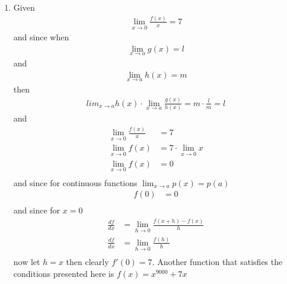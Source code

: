 \documentclass[10pt]{article}
\begin{document}
\begin{enumerate}
        \pagebreak
    \item Given
        \begin{align*}
        \lim_{x \to 0}\frac{f(x)}{x} = 7
        \end{align*}
        and since when 
        \begin{align*}
            \lim_{x \to a}g(x) = l
        \end{align*}
        and 
        \begin{align*}
            \lim_{x \to a}h(x) = m
        \end{align*}
        then
        \begin{align*}
        lim_{x \to a}h(x)\cdot\lim_{x \to a}\frac{g(x)}{h(x)} = m\cdot\frac{l}{m} = l
        \end{align*}
        and
        \begin{align*}
            \lim_{x \to 0} \frac{f(x)}{x} &= 7 \\
            \lim_{x \to 0}f(x) &= 7 \cdot \lim_{x \to 0} x \\
            \lim_{x \to 0}f(x) &= 0 \\
        \end{align*}
        and since for continuous functions $\lim_{x \to a}p(x) = p(a)$
        \begin{align*}
            f(0) &= 0 \\
        \end{align*}
        and since for $x = 0$
        \begin{align*}
            \frac{df}{dx} &= \lim_{h \to 0} \frac{f(x + h) - f(x)}{h} \\
            \frac{df}{dx} &= \lim_{h \to 0} \frac{f(h)}{h} \\
        \end{align*}
            now let $h =x$ then clearly $f'(0) = 7$. Another function that
            satisfies the conditions presented here is $f(x) = x^{9000} + 7x$


\end{enumerate}
\end{document}
